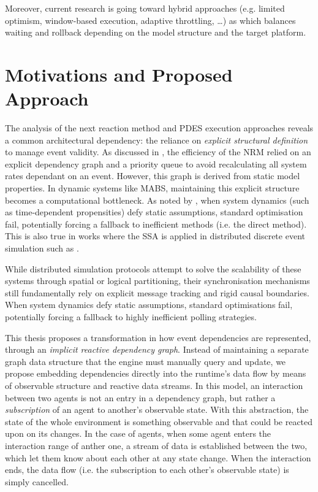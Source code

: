 Moreover, current research is going toward hybrid approaches (e.g. limited
optimism, window-based execution, adaptive throttling, \dots) as
\cite{piccione2023HSSPDES} which balances waiting and rollback depending on the
model structure and the target platform.

\section{Motivations and Proposed Approach}
\label{sec:motivations_and_proposal}

The analysis of the next reaction method and \ac{PDES} execution approaches
reveals a common architectural dependency: the reliance on \emph{explicit
	structural definition} to manage event validity. As discussed in
, the efficiency of the \ac{NRM} relied on an
explicit dependency graph and a priority queue to avoid recalculating all
system rates dependant on an event. However, this graph is derived from static
model properties. In dynamic systems like \ac{MABS}, maintaining this explicit
structure becomes a computational bottleneck. As noted by
\cite{anderson2007MNRM}, when system dynamics (such as time-dependent
propensities) defy static assumptions, standard optimisation fail, potentially
forcing a fallback to inefficient methods (i.e. the direct method).
This is also true in works where the \ac{SSA} is applied in distributed
discrete event simulation such as \cite{bauco2025MDPDSSCRN}.

While distributed simulation protocols attempt to solve the scalability of
these systems through spatial or logical partitioning, their synchronisation
mechanisms still fundamentally rely on explicit message tracking and rigid
causal boundaries. When system dynamics defy static assumptions,
standard optimisations fail, potentially forcing a fallback to highly
inefficient polling strategies.

This thesis proposes a transformation in how event dependencies are
represented, through an \emph{implicit reactive dependency graph}. Instead of
maintaining a separate graph data structure that the engine must manually query
and update, we propose embedding dependencies directly into the runtime's data
flow by means of observable structure and reactive data streams.
In this model, an interaction between two agents is not an entry in a
dependency graph, but rather a \emph{subscription} of an agent to another's
observable state.
With this abstraction, the state of the whole environment is something
observable and that could be reacted upon on its changes. In the case of
agents, when some agent enters the interaction range of anther one, a stream of
data is established between the two, which let them know about each other at
any state change. When the interaction ends, the data flow (i.e. the
subscription to each other's observable state) is simply cancelled.

